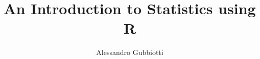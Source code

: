 \newcommand{\mmu}{{\pmb \mu}}
\newcommand{\jj}{{\pmb j}}

\usepackage{color}
\newcommand{\commento}[1]{
	\par\noindent
	\colorbox{light}{\begin{minipage}{120 mm}#1\end{minipage}}
	\par\noindent
}


\parindent0pt






\title{ An Introduction to Statistics using R}
\author{Alessandro Gubbiotti}


\usepackage{tikz}
\usetikzlibrary{calc,patterns,decorations.pathmorphing}

